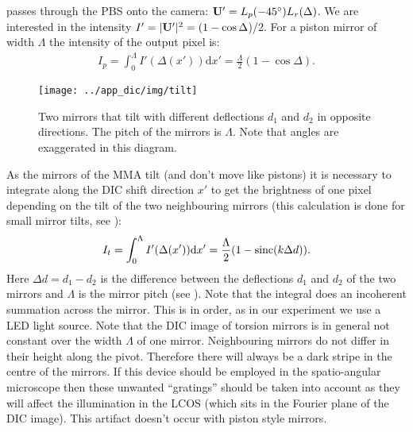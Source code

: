 passes through the PBS onto the camera: $\mathbf{U}'=L_p(-45^\circ)L_r(\Delta)$. We are interested in the intensity
$I'=|\mathbf{U}'|^2=(1-\cos\Delta$)/2.  For a piston mirror of width
$\Lambda$ the intensity of the output pixel is:
\begin{align}
  I_p=\int_0^\Lambda I'(\Delta(x'))\textrm{d}x'=\frac{\Lambda}{2}(1-\cos \Delta).
\end{align}
\begin{figure}[ht]
  \centering
  \texttt{[image: ../app\_dic/img/tilt]}
  \caption{
Two mirrors that tilt with different deflections $d_1$ and $d_2$ in
opposite directions. The pitch of the mirrors is $\Lambda$. Note that
angles are exaggerated in this diagram.}
  \label{fig:tilt}
\end{figure}
As the mirrors of the MMA tilt (and don't move like pistons) it is
necessary to integrate along the DIC shift direction $x'$ to get the
brightness of one pixel depending on the tilt of the two neighbouring
mirrors (this calculation is done for small mirror tilts, see
):
\begin{align}
\label{eqn:it}
  I_t=\int_0^\Lambda I'(\Delta(x')) \textrm{d}x'=\frac{\Lambda}{2}(1-\operatorname*{sinc}(k \Delta d)).
\end{align}
Here $\Delta d=d_1-d_2$ is the difference between the deflections
$d_1$ and $d_2$ of the two mirrors and $\Lambda$ is the mirror pitch
(see ). Note that the integral does an incoherent
summation across the mirror. This is in order, as in our experiment we
use a LED light source. Note that the DIC image of torsion mirrors is
in general not constant over the width $\Lambda$ of one
mirror. Neighbouring mirrors do not differ in their height along the
pivot. Therefore there will always be a dark stripe in the centre of
the mirrors. If this device should be employed in the spatio-angular
microscope then these unwanted ``gratings'' should be taken into
account as they will affect the illumination in the LCOS (which sits
in the Fourier plane of the DIC image). This artifact doesn't occur
with piston style mirrors.

